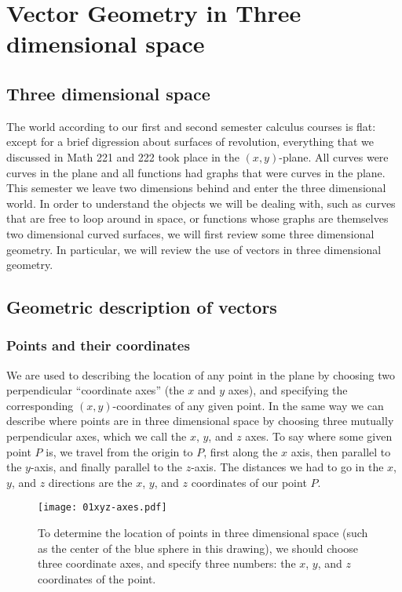 

\chapter{Vector Geometry in Three dimensional space}

\section{Three dimensional space}  
The world according to our first and second semester calculus courses is flat:
except for a brief digression about surfaces of revolution, everything that we
discussed in Math 221 and 222 took place in the $(x,y)$-plane.  All curves were
curves in the plane and all functions had graphs that were curves in the plane.
This semester we leave two dimensions behind and enter the three dimensional
world.  In order to understand the objects we will be dealing with, such as
curves that are free to loop around in space, or functions whose graphs are
themselves two dimensional curved surfaces, we will first review some three
dimensional geometry.  In particular, we will review the use of vectors in three
dimensional geometry.

\section{Geometric description of vectors}  
\label{sec:geometric-description-of-vectors}
\subsection{Points and their coordinates}  
We are used to describing the location of any point in the plane by choosing two
perpendicular ``coordinate axes'' (the $x$ and $y$ axes), and specifying the
corresponding $(x,y)$-coordinates of any given point.  In the same way we can
describe where points are in three dimensional space by choosing three mutually
perpendicular axes, which we call the $x$, $y$, and $z$ axes.  To say where some
given point $P$ is, we travel from the origin to $P$, first along the $x$ axis,
then parallel to the $y$-axis, and finally parallel to the $z$-axis.  The
distances we had to go in the $x$, $y$, and $z$ directions are the $x$, $y$, and
$z$ coordinates of our point $P$.

\begin{figure}[h]
  \centering
  \texttt{[image: 01xyz-axes.pdf]}
  \caption{To determine the location of points in three dimensional
    space (such as the center of the blue sphere in this drawing), we
    should choose three coordinate axes, and specify three numbers:
    the $x$, $y$, and $z$ coordinates of the point.  }
\end{figure}

